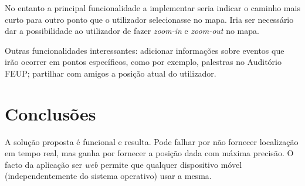 \documentclass[twocolumn,twoside,11pt]{article}
\begin{document}
  No entanto a principal funcionalidade a implementar seria indicar o caminho mais curto para outro ponto que o utilizador selecionasse no mapa.
  Iria ser necessário dar a possibilidade ao utilizador de fazer \emph{zoom-in} e \emph{zoom-out} no mapa.

  Outras funcionalidades interessantes: adicionar informações sobre eventos que irão ocorrer em pontos específicos, como por exemplo, palestras no Auditório FEUP; partilhar com amigos a posição atual do utilizador.



\section{Conclusões} %
\label{sec:conclusoes}
  A solução proposta é funcional e resulta. Pode falhar por não fornecer localização em tempo real, mas ganha por fornecer a posição dada com máxima precisão.
  O facto da aplicação ser \emph{web} permite que qualquer dispositivo móvel (independentemente do sistema operativo) usar a mesma.



\renewcommand{\bibname}{Referências}



\end{document}
